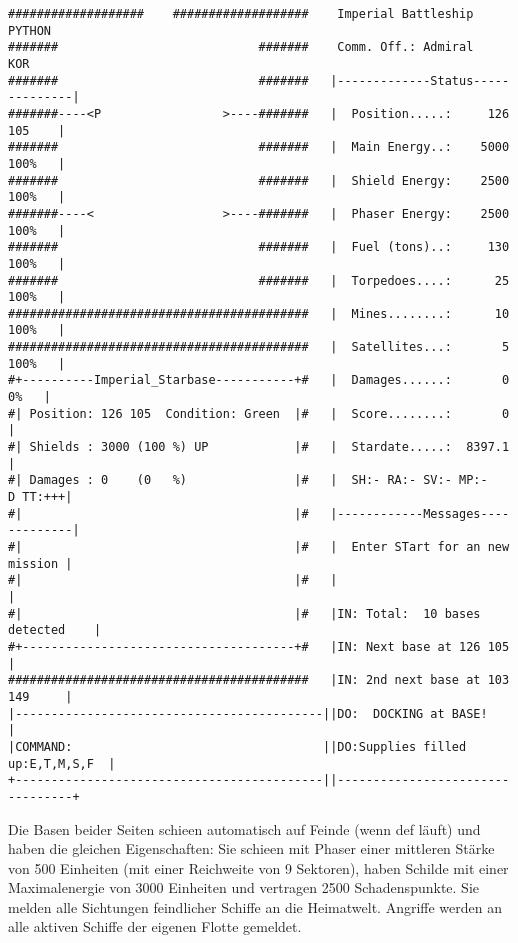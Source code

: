 \hspace{-1.0cm}
\begin{verbatim}
###################    ###################    Imperial Battleship  PYTHON
#######                            #######    Comm. Off.: Admiral    KOR
#######                            #######   |-------------Status--------------|
#######----<P                 >----#######   |  Position.....:     126  105    |
#######                            #######   |  Main Energy..:    5000  100%   |
#######                            #######   |  Shield Energy:    2500  100%   |
#######----<                  >----#######   |  Phaser Energy:    2500  100%   |
#######                            #######   |  Fuel (tons)..:     130  100%   |
#######                            #######   |  Torpedoes....:      25  100%   |
##########################################   |  Mines........:      10  100%   |
##########################################   |  Satellites...:       5  100%   |
#+----------Imperial_Starbase-----------+#   |  Damages......:       0    0%   |
#| Position: 126 105  Condition: Green  |#   |  Score........:       0         |
#| Shields : 3000 (100 %) UP            |#   |  Stardate.....:  8397.1         |
#| Damages : 0    (0   %)               |#   |  SH:- RA:- SV:- MP:-    D TT:+++|
#|                                      |#   |------------Messages-------------|
#|                                      |#   |  Enter STart for an new mission |
#|                                      |#   |                                 |
#|                                      |#   |IN: Total:  10 bases detected    |
#+--------------------------------------+#   |IN: Next base at 126 105         |
##########################################   |IN: 2nd next base at 103 149     |
|-------------------------------------------||DO:  DOCKING at BASE!            |
|COMMAND:                                   ||DO:Supplies filled up:E,T,M,S,F  |
+-------------------------------------------||---------------------------------+\end{verbatim}

\normalsize

Die Basen beider Seiten schie\3en automatisch auf Feinde (wenn def l\"auft)
und haben die gleichen Eigenschaften: Sie schie\3en mit Phaser einer
mittleren St\"arke von 500 Einheiten (mit einer Reichweite von
9 Sektoren), haben Schilde mit einer 
Maximalenergie von 3000 Einheiten und vertragen 2500 Scha\-dens\-punkte.
Sie melden alle Sichtungen feindlicher Schiffe an die Heimatwelt. Angriffe
werden an alle aktiven Schiffe der eigenen Flotte gemeldet.

